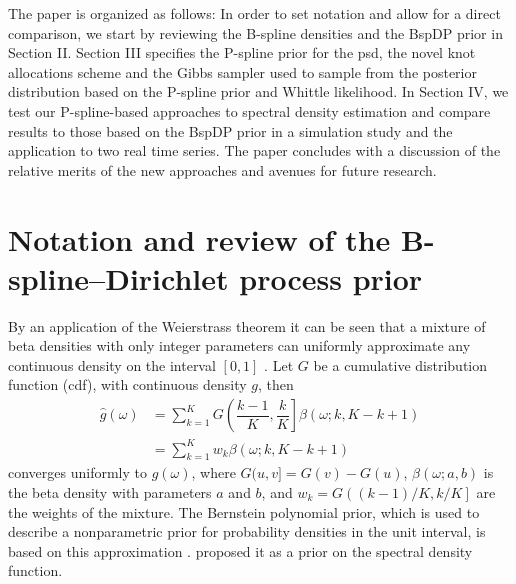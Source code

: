 \documentclass[twocolumn,final]{svjour3}
\begin{document}
The paper is organized as follows: In order to set notation and allow for a direct comparison, we start by
reviewing the B-spline densities and the BspDP prior in Section II. Section III specifies the P-spline prior for the psd, the novel knot allocations scheme and the Gibbs sampler used to sample from the posterior distribution based on the P-spline prior and Whittle likelihood.  In Section IV, we test our P-spline-based approaches to spectral density estimation and compare results to those based on the BspDP prior in a simulation study and the application to two real time series. The paper concludes with a discussion of the relative merits of the new approaches and avenues for future research.

\section{Notation and review of the B-spline--Dirichlet process prior}

By an application of the Weierstrass theorem it can be seen that a mixture of beta densities with only integer parameters can uniformly approximate any continuous density  on the interval $[0,1]$ \citep{Choudhuri:2004}.  Let $G$ be a cumulative distribution function (cdf), with continuous density $g$, then 
\begin{align}
\label{eq:Bernstein}
\widehat{g}(\omega) &= \sum_{k=1}^{K} G \left( \dfrac{k-1}{K} , \dfrac{k}{K} \right] \beta(\omega; k, K-k+1)\\
&= \sum_{k=1}^{K} w_k \beta(\omega; k, K-k+1) \nonumber
\end{align}	  
converges uniformly to $g(\omega)$, where $G(u,v] = G(v) - G(u)$, $\beta(\omega; a,b)$ is the beta density with parameters $a$ and $b$, and $w_k=G\left((k-1)/K, k/K \right]$ are the weights of the mixture.
The Bernstein polynomial prior, which is used to describe a nonparametric prior for probability densities in the unit interval, is based on this approximation \citep{Petrone:1999a,Petrone:199b}.  \cite{Choudhuri:2004} proposed it as a prior on the spectral density function.
\end{document}
